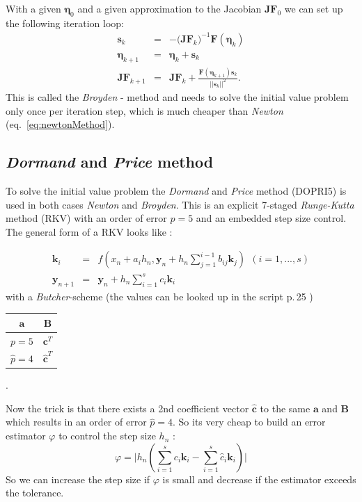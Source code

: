 \documentclass[11pt,a4paper,oneside]{scrartcl}
\begin{document}
With a given $\boldsymbol{\eta}_0$ and a given approximation to the Jacobian $\boldsymbol{JF}_0$ we can set up the following iteration loop:
\begin{eqnarray}
\boldsymbol{s}_k &=& - \big(\boldsymbol{JF}_k\big)^{-1}\boldsymbol{F}(\boldsymbol{\eta}_k) \\
\boldsymbol{\eta}_{k+1} &=& \boldsymbol{\eta}_k + \boldsymbol{s}_k \\
\boldsymbol{JF}_{k+1} &=& \boldsymbol{JF}_k + \frac{\boldsymbol{F}(\boldsymbol{\eta}_{k+1}) \boldsymbol{s}_k }{|| \boldsymbol{s}_k ||^2} .
\end{eqnarray}
This is called the \textit{Broyden} - method and needs to solve the initial value problem only once per iteration step, which is much cheaper than \textit{Newton} (eq.~\ref{eq:newtonMethod}).

\subsection{\textit{Dormand} and \textit{Price} method}
To solve the initial value problem the \textit{Dormand} and \textit{Price} method (DOPRI5) is used in both cases \textit{Newton} and \textit{Broyden}. This is an explicit 7-staged \textit{Runge-Kutta} method (RKV) with an order of error $p = 5$ and an embedded step size control. The general form of a RKV looks like :  

\begin{eqnarray*}
\boldsymbol{k}_i &=& f\left(x_n + a_ih_n,\boldsymbol{y}_n+h_n\sum\limits_{j=1}^{i-1}b_{ij}\boldsymbol{k}_j\right)~~(i=1,...,s) \\
\boldsymbol{y}_{n+1} &=& \boldsymbol{y}_n + h_n\sum\limits_{i=1}^sc_i\boldsymbol{k}_i
\end{eqnarray*}
with a \textit{Butcher}-scheme (the values can be looked up in the script p.\,25 )
\begin{tabular}{c|c}
$\boldsymbol{a}$ & $\boldsymbol{B}$  \\ \hline
$p=5$ & $\boldsymbol{c}^T$ \\ \hline
$\hat{p} = 4$ &  $\hat{\boldsymbol{c}}^T$ \\
\end{tabular}.

Now the trick is that there exists a 2nd coefficient vector $\hat{\boldsymbol{c}}$ to the same $\boldsymbol{a}$ and $\boldsymbol{B}$ which results in an order of error $\hat{p} = 4$. So its very cheap to build an error estimator $\varphi$ to control the step size $h_n$ :
\begin{equation}
\varphi = \Bigg| h_n\left(   \sum\limits_{i=1}^sc_i\boldsymbol{k}_i - \sum\limits_{i=1}^s\hat{c}_i\boldsymbol{k}_i \right)\Bigg|
\label{eq:errEstimator}
\end{equation}
So we can increase the step size if $\varphi$ is small and decrease if the estimator exceeds the tolerance.
\end{document}
